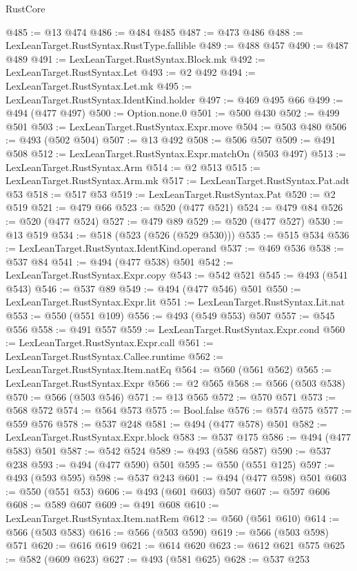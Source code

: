 \begin{lexlean}{RustCore}
\begin{coremodule}
@485 := @13 @474
@486 := @484 @485
@487 := @473 @486
@488 := LexLeanTarget.RustSyntax.RustType.fallible
@489 := @488 @457
@490 := @487 @489
@491 := LexLeanTarget.RustSyntax.Block.mk
@492 := LexLeanTarget.RustSyntax.Let
@493 := @2 @492
@494 := LexLeanTarget.RustSyntax.Let.mk
@495 := LexLeanTarget.RustSyntax.IdentKind.holder
@497 := @469 @495 @66
@499 := @494 (@477 @497)
@500 := Option.none.{0}
@501 := @500 @430
@502 := @499 @501
@503 := LexLeanTarget.RustSyntax.Expr.move
@504 := @503 @480
@506 := @493 (@502 @504)
@507 := @13 @492
@508 := @506 @507
@509 := @491 @508
@512 := LexLeanTarget.RustSyntax.Expr.matchOn (@503 @497)
@513 := LexLeanTarget.RustSyntax.Arm
@514 := @2 @513
@515 := LexLeanTarget.RustSyntax.Arm.mk
@517 := LexLeanTarget.RustSyntax.Pat.adt @53
@518 := @517 @53
@519 := LexLeanTarget.RustSyntax.Pat
@520 := @2 @519
@521 := @479 @66
@523 := @520 (@477 @521)
@524 := @479 @84
@526 := @520 (@477 @524)
@527 := @479 @89
@529 := @520 (@477 @527)
@530 := @13 @519
@534 := @518 (@523 (@526 (@529 @530)))
@535 := @515 @534
@536 := LexLeanTarget.RustSyntax.IdentKind.operand
@537 := @469 @536
@538 := @537 @84
@541 := @494 (@477 @538) @501
@542 := LexLeanTarget.RustSyntax.Expr.copy
@543 := @542 @521
@545 := @493 (@541 @543)
@546 := @537 @89
@549 := @494 (@477 @546) @501
@550 := LexLeanTarget.RustSyntax.Expr.lit
@551 := LexLeanTarget.RustSyntax.Lit.nat
@553 := @550 (@551 @109)
@556 := @493 (@549 @553) @507
@557 := @545 @556
@558 := @491 @557
@559 := LexLeanTarget.RustSyntax.Expr.cond
@560 := LexLeanTarget.RustSyntax.Expr.call
@561 := LexLeanTarget.RustSyntax.Callee.runtime
@562 := LexLeanTarget.RustSyntax.Item.natEq
@564 := @560 (@561 @562)
@565 := LexLeanTarget.RustSyntax.Expr
@566 := @2 @565
@568 := @566 (@503 @538)
@570 := @566 (@503 @546)
@571 := @13 @565
@572 := @570 @571
@573 := @568 @572
@574 := @564 @573
@575 := Bool.false
@576 := @574 @575
@577 := @559 @576
@578 := @537 @248
@581 := @494 (@477 @578) @501
@582 := LexLeanTarget.RustSyntax.Expr.block
@583 := @537 @175
@586 := @494 (@477 @583) @501
@587 := @542 @524
@589 := @493 (@586 @587)
@590 := @537 @238
@593 := @494 (@477 @590) @501
@595 := @550 (@551 @125)
@597 := @493 (@593 @595)
@598 := @537 @243
@601 := @494 (@477 @598) @501
@603 := @550 (@551 @53)
@606 := @493 (@601 @603) @507
@607 := @597 @606
@608 := @589 @607
@609 := @491 @608
@610 := LexLeanTarget.RustSyntax.Item.natRem
@612 := @560 (@561 @610)
@614 := @566 (@503 @583)
@616 := @566 (@503 @590)
@619 := @566 (@503 @598) @571
@620 := @616 @619
@621 := @614 @620
@623 := @612 @621 @575
@625 := @582 (@609 @623)
@627 := @493 (@581 @625)
@628 := @537 @253

\end{coremodule}
\end{lexlean}
